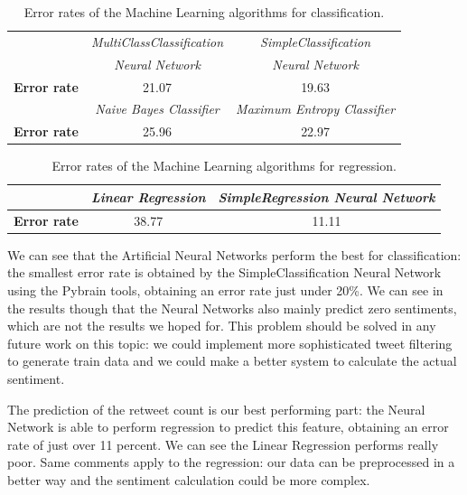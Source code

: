 \documentclass[10pt]{IEEEtran}
\begin{document}
\begin{table}[h!]
	\centering
		\begin{tabular}{ | >{\bfseries}l || c | c |}
		\hline
		& \emph{MultiClassClassification} & \emph{SimpleClassification} \\ 
		& \emph{Neural Network} & \emph{Neural Network} \\
		\hline
		\hline
		Error rate & 21.07 & 19.63 \\ 
		\hline  
		&  \emph{Naive Bayes Classifier} &  \emph{Maximum Entropy Classifier} \\
		\hline
		\hline
		Error rate &  25.96 & 22.97 \\
		\hline
		\end{tabular}
    \caption{Error rates of the Machine Learning algorithms for classification.}
    \label{tableclassification}
\end{table} 

\begin{table}[h]
	\centering
		\begin{tabular}{ | >{\bfseries}l || c | c |}
		\hline
		&  \emph{Linear Regression} & \emph{SimpleRegression Neural Network} \\ 
		\hline
		\hline
		Error rate & 38.77 & 11.11 \\ 
		\hline  
		\end{tabular}
    \caption{Error rates of the Machine Learning algorithms for regression.}
    \label{tableregression}
\end{table} 

We can see that the Artificial Neural Networks perform the best for classification: the smallest error rate is obtained by the SimpleClassification Neural Network using the Pybrain tools, obtaining an error rate just under 20\%. We can see in the results though that the Neural Networks also mainly predict zero sentiments, which are not the results we hoped for. This problem should be solved in any future work on this topic: we could implement more sophisticated tweet filtering to generate train data and we could make a better system to calculate the actual sentiment. 

The prediction of the retweet count is our best performing part: the Neural Network is able to perform regression to predict this feature, obtaining an error rate of just over 11 percent. We can see the Linear Regression performs really poor. Same comments apply to the regression: our data can be preprocessed in a better way and the sentiment calculation could be more complex. 
\end{document}
